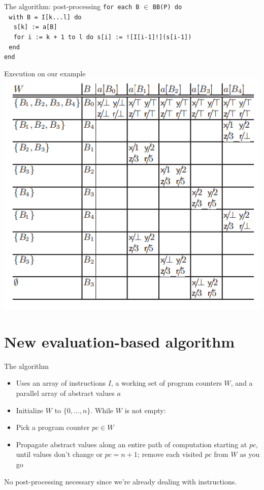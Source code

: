 \documentclass{beamer}
\begin{document}
\begin{frame}{The algorithm: post-processing}
\smallskip
{\tt for each B} $\in$ {\tt BB(P) do} \\
$\, \,$ {\tt with B = I[k...l] do} \\
$\, \, \, \, \, \,$ {\tt s[k] := a[B]} \\
$\, \, \, \, \, \,$ {\tt for i := k + 1 to l do s[i] := ![I[i-1]!](s[i-1])} \\
$\, \,$ {\tt end} \\
{\tt end}
\end{frame}

\begin{frame}{Execution on our example}
\includegraphics[scale=0.35]{classic.png}
\end{frame}

\section{New evaluation-based algorithm}
\begin{frame}{The algorithm}
\begin{itemize}
\item Uses an array of instructions $I$, a working set of program counters
$W$, and a parallel array of abstract values $a$
\item Initialize $W$ to $\{0,\dots,n\}$. While $W$ is not empty:
\item Pick a program counter $pc \in W$
\item Propagate abstract values along an entire path of computation starting
at $pc$, until values don't change or $pc = n + 1$; remove each visited
$pc$ from $W$ as you go
\end{itemize}
No post-processing necessary since we're already dealing with instructions.
\end{frame}
\end{document}

